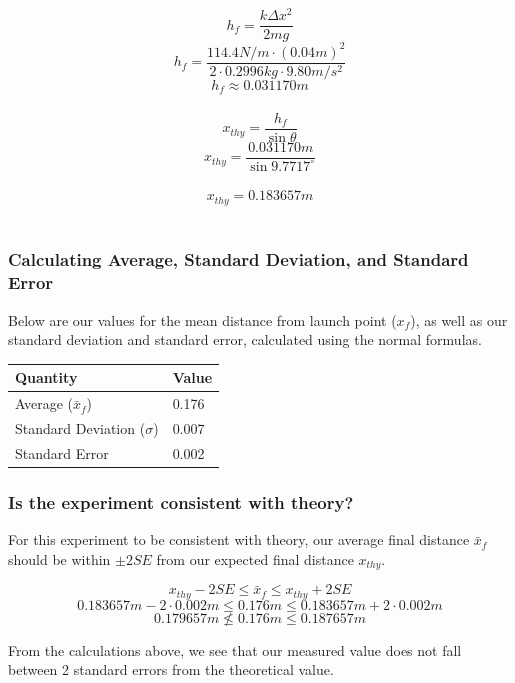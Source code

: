 \documentclass[11pt, letterpaper, includehead]{article}
\begin{document}
$$h_f = \frac{k\Delta x^2}{2mg}$$
$$h_f = \frac{114.4N/m\cdot(0.04m)^2}{2\cdot0.2996kg\cdot9.80m/s^2}$$
$$h_f \approx 0.031170m$$\\
$$x_{thy} = \frac{h_f}{\sin\theta}$$
$$x_{thy} = \frac{0.031170m}{\sin9.7717^{\circ}}$$\\
$$x_{thy} = \boxed{0.183657m}$$\\

\subsubsection{Calculating Average, Standard Deviation, and Standard Error}
Below are our values for the mean distance from launch point ($x_f$), as well
as our standard deviation and standard error, calculated using the normal formulas.

\begin{center} 
  \begin{tabular}{|  m{4cm} | m{3cm} | } 
    \hline 
    \textbf{Quantity} & \textbf{Value}\\
    \hline
    Average ($\bar{x}_f$) & 0.176  \\ 
    \hline
    Standard Deviation ($\sigma$)& 0.007\\ 
    \hline
    Standard Error & 0.002\\ 
    \hline      
  \end{tabular} 
\end{center}


\subsubsection{Is the experiment consistent with theory?}
For this experiment to be consistent with theory, our average final distance
$\bar{x}_f$ should be within $\pm 2SE$ from our expected final distance $x_{thy}$.

$$x_{thy} - 2SE \le \bar{x}_f \le x_{thy} + 2SE$$
$$0.183657m - 2\cdot 0.002m \le 0.176m \le 0.183657m + 2\cdot 0.002m$$
$$0.179657m \nleq 0.176m \le 0.187657m$$

From the calculations above, we see that our measured value does not fall between
2 standard errors from the theoretical value.
\end{document}
